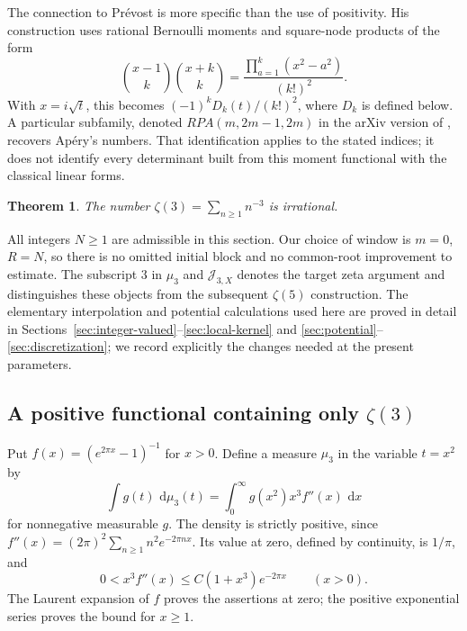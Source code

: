 \documentclass[11pt,letterpaper]{article}
\newtheorem{theorem}{Theorem}[section]
\theoremstyle{definition}
\newcommand{\dd}{\,\mathrm d}
\begin{document}
The connection to Pr\'evost is more specific than the use of positivity.
His construction uses rational Bernoulli moments and square-node products
of the form
\[
 \binom{x-1}{k}\binom{x+k}{k}
 =\frac{\prod_{a=1}^{k}(x^2-a^2)}{(k!)^2}.
\]
With $x=i\sqrt t$, this becomes $(-1)^kD_k(t)/(k!)^2$, where $D_k$
is defined below. A particular subfamily, denoted
$RPA(m,2m-1,2m)$ in the arXiv version of \cite[Section~5.2]{prevost2019},
recovers Ap\'ery's numbers. That identification applies to the stated
indices; it does not identify every determinant built from this moment
functional with the classical linear forms.

\begin{theorem}\label{thm:z3-warmup}
The number $\zeta(3)=\sum_{n\ge1}n^{-3}$ is irrational.
\end{theorem}

All integers $N\ge1$ are admissible in this section. Our choice of window
is $m=0$, $R=N$, so there is no omitted initial block and no common-root
improvement to estimate. The subscript $3$ in $\mu_3$ and
$\mathcal J_{3,X}$ denotes the target zeta argument and distinguishes
these objects from the subsequent $\zeta(5)$ construction. The elementary
interpolation and potential calculations used here are proved in detail
in Sections~\ref{sec:integer-valued}--\ref{sec:local-kernel} and
\ref{sec:potential}--\ref{sec:discretization}; we record explicitly the
changes needed at the present parameters.

\subsection{A positive functional containing only \texorpdfstring{$\zeta(3)$}{zeta(3)}}

Put $f(x)=(e^{2\pi x}-1)^{-1}$ for $x>0$. Define a measure $\mu_3$ in
the variable $t=x^2$ by
\begin{equation}\label{eq:z3-measure}
 \int g(t)\,\dd\mu_3(t)
 =\int_0^\infty g(x^2)x^3 f''(x)\,\dd x
\end{equation}
for nonnegative measurable $g$. The density is strictly positive, since
$f''(x)=(2\pi)^2\sum_{n\ge1}n^2e^{-2\pi nx}$. Its value at zero,
defined by continuity, is $1/\pi$, and
\begin{equation}\label{eq:z3-density-bound}
 0<x^3f''(x)\le C(1+x^3)e^{-2\pi x}\qquad(x>0).
\end{equation}
The Laurent expansion of $f$ proves the assertions at zero; the positive
exponential series proves the bound for $x\ge1$.
\end{document}
